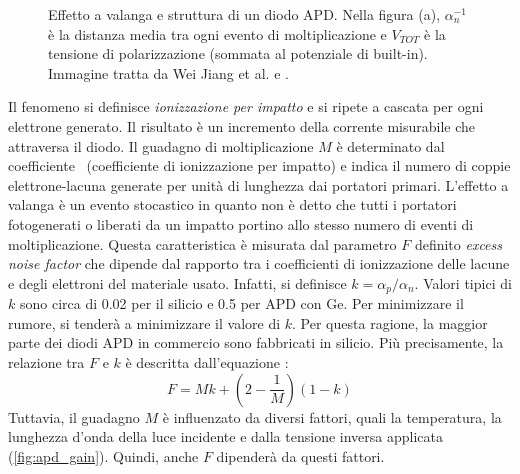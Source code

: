 \begin{figure}[tbh]
\begin{minipage}{.45\textwidth}
	\end{minipage}
	\caption{Effetto a valanga e struttura di un diodo APD. Nella figura (a), $\alpha_n^{-1}$ è la distanza media tra ogni evento di moltiplicazione e $V_{TOT}$ è la tensione di polarizzazione (sommata al potenziale di built-in). Immagine tratta da Wei Jiang et al. \cite{Jiang2019} e \cite{ApdImage}.} 
	\label{fig:apd}
\end{figure}
Il fenomeno si definisce \textit{ionizzazione per impatto} e si ripete a cascata per ogni elettrone generato. Il risultato è un incremento della corrente misurabile che attraversa il diodo. Il guadagno di moltiplicazione $M$ è determinato dal coefficiente \textalpha\ (coefficiente di ionizzazione per impatto) e indica il numero di coppie elettrone-lacuna generate per unità di lunghezza \cite{Jiang2019} dai portatori primari.
L'effetto a valanga è un evento stocastico in quanto non è detto che tutti i portatori fotogenerati o liberati da un impatto portino allo stesso numero di eventi di moltiplicazione. Questa caratteristica è misurata dal parametro $F$ definito \textit{excess noise factor} che dipende dal rapporto tra i coefficienti di ionizzazione delle lacune e degli elettroni del materiale usato. Infatti, si definisce $k=\alpha_p / \alpha_n$. Valori tipici di $k$ sono circa di 0.02 per il silicio e 0.5 per APD con Ge. Per minimizzare il rumore, si tenderà a minimizzare il valore di $k$. Per questa ragione, la maggior parte dei diodi APD in commercio sono fabbricati in silicio. Più precisamente, la relazione tra $F$ e $k$ è descritta dall'equazione \cite{HAMAMATSU2021}\cite{Hossain2019}:
\begin{equation}
	F=Mk+(2-\frac{1}{M})(1-k)
\end{equation}
Tuttavia, il guadagno $M$ è influenzato da diversi fattori, quali la temperatura, la lunghezza d'onda della luce incidente e dalla tensione inversa applicata (\Fig\ref{fig:apd_gain}). Quindi, anche $F$ dipenderà da questi fattori. 
